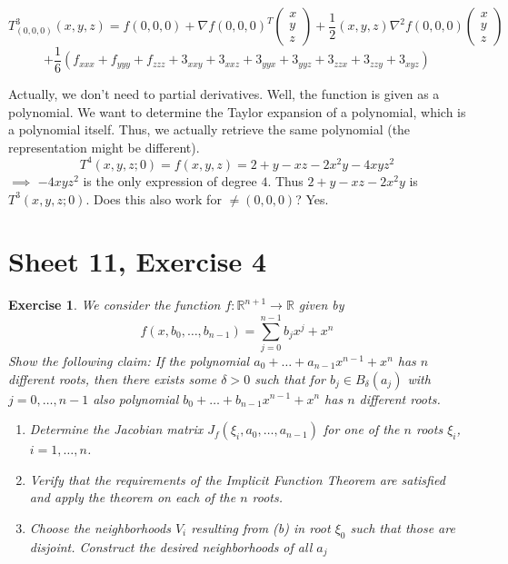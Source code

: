 \documentclass{article}
\newtheorem{ex}{Exercise} %
\begin{document}
\[ T_{(0,0,0)}^3(x, y, z) = f(0, 0, 0) + \nabla f(0, 0, 0)^T \begin{pmatrix} x \\ y \\ z \end{pmatrix} + \frac12 (x, y, z) \nabla^2 f(0, 0, 0) \begin{pmatrix} x \\ y \\ z \end{pmatrix} \]
\[ + \frac16 (f_{xxx} + f_{yyy} + f_{zzz} + 3_{xxy} + 3_{xxz} + 3_{yyx} + 3_{yyz} + 3_{zzx} + 3_{zzy} + 3_{xyz}) \]

Actually, we don't need to partial derivatives.
Well, the function is given as a polynomial. We want to determine the Taylor expansion of a polynomial, which is a polynomial itself. Thus, we actually retrieve the same polynomial (the representation might be different).
\[ T^4 (x, y, z; 0) = f(x, y, z) = 2 + y - xz - 2x^2 y - 4xyz^2 \]
$\implies$ $-4xyz^2$ is the only expression of degree $4$. Thus $2 + y - xz - 2x^2 y$ is $T^3(x, y, z; 0)$.
Does this also work for $\neq (0, 0, 0)$? Yes.

\section{Sheet 11, Exercise 4}
\begin{ex}
  We consider the function $f: \mathbb R^{n+1} \to \mathbb R$ given by
  \[ f(x, b_0, \dots, b_{n-1}) = \sum_{j=0}^{n-1} b_j x^j + x^n \]
  Show the following claim:
  If the polynomial $a_0 + \dots + a_{n-1} x^{n-1} + x^n$ has $n$ different roots,
  then there exists some $\delta > 0$ such that for $b_j \in B_{\delta}(a_j)$ with $j = 0, \dots, n-1$
  also polynomial $b_0 + \dots + b_{n-1} x^{n-1} + x^n$ has $n$ different roots.
  \begin{enumerate}
    \item Determine the Jacobian matrix $J_f(\xi_i, a_0, \dots, a_{n-1})$ for one of the $n$ roots $\xi_i$, $i = 1,\dots,n$.
    \item Verify that the requirements of the Implicit Function Theorem are satisfied and apply the theorem on each of the $n$ roots.
    \item Choose the neighborhoods $V_i$ resulting from (b) in root $\xi_0$ such that those are disjoint. Construct the desired neighborhoods of all $a_j$
  \end{enumerate}
\end{ex}
\end{document}
